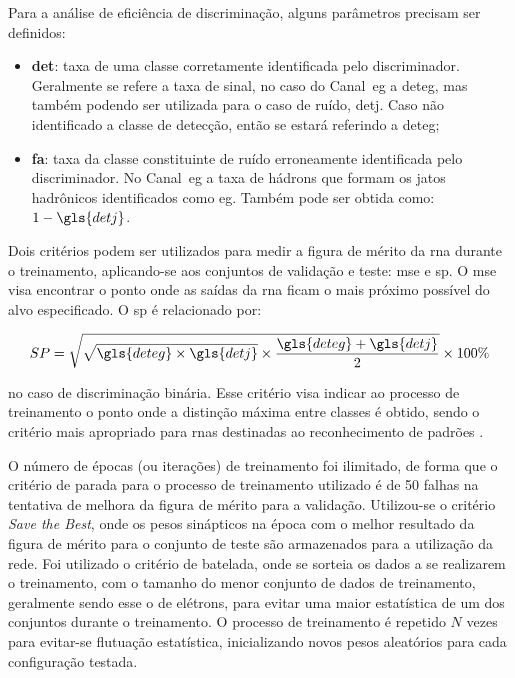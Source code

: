 Para a análise de eficiência de discriminação, alguns parâmetros precisam ser definidos:

\begin{itemize}
\item \textbf{\gls{det}}: taxa de uma classe corretamente identificada pelo
discriminador. Geralmente se refere a taxa de sinal, no caso do Canal~\gls{eg} a
\gls{deteg}, mas também podendo ser utilizada para o caso de ruído, \gls{detj}.
Caso não identificado a classe de detecção, então se estará referindo a
\gls{deteg};
\item \textbf{\gls{fa}}: taxa da classe constituinte de ruído erroneamente
identificada pelo discriminador. No Canal~\gls{eg} a taxa de hádrons que formam os
jatos hadrônicos identificados como \gls{eg}. Também pode
ser obtida como: $1-\gls{detj}$.
\end{itemize}

Dois critérios podem ser utilizados para medir a figura de mérito da \gls{rna}
durante o treinamento, aplicando-se aos conjuntos de validação e teste: \gls{mse} 
e \gls{sp}. O \gls{mse} visa encontrar o ponto onde as saídas da \gls{rna} ficam
o mais próximo possível do alvo especificado. O \gls{sp} é relacionado por:

\begin{equation} \label{eq:produto_sp}
SP = \sqrt{ \sqrt{\gls{deteg}\times \gls{detj}}\times\frac{\gls{deteg}+\gls{detj}}{2}}\times100\%
\end{equation}

\noindent no caso de discriminação binária. Esse critério visa indicar ao
processo de treinamento o ponto onde a distinção máxima entre classes é obtido,
sendo o critério mais apropriado para \glspl{rna} destinadas ao reconhecimento de
padrões \cite{tese_torres}.

O número de épocas (ou iterações) de treinamento foi ilimitado, de forma que o
critério de parada para o processo de treinamento utilizado é de 50 falhas na tentativa
de melhora da figura de mérito para a validação. 
Utilizou-se o critério \emph{Save the Best}, onde os pesos sinápticos na época com 
o melhor resultado da figura de mérito para o conjunto de teste são armazenados 
para a utilização da rede. Foi utilizado o critério de batelada, onde se sorteia os
dados a se realizarem o treinamento, com o tamanho do menor 
conjunto de dados de treinamento, geralmente sendo esse o de elétrons, para
evitar uma maior estatística de um dos conjuntos durante o treinamento. O
processo de treinamento é repetido $N$ vezes para evitar-se flutuação
estatística, inicializando novos pesos aleatórios para cada configuração 
testada.

